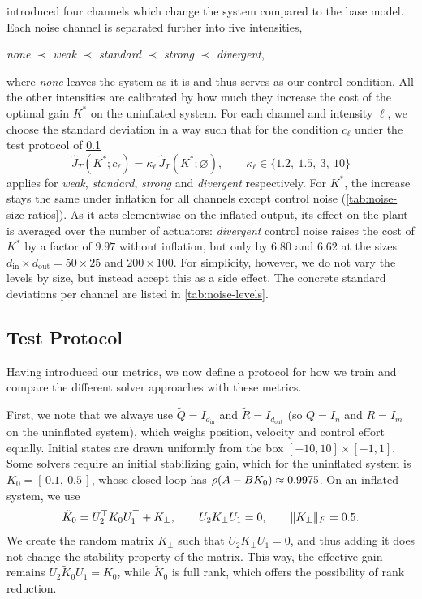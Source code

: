  introduced four channels which change the system
compared to the base model. Each noise channel is separated further
into five intensities,
\begin{center}
    \emph{none} $\prec$ \emph{weak} $\prec$ \emph{standard} $\prec$
    \emph{strong} $\prec$ \emph{divergent},
\end{center}
where \emph{none} leaves the system as it is and thus serves as our
control condition. All the other intensities are calibrated by how much
they increase the cost of the optimal gain $K^{*}$ on the uninflated system.
For each channel and intensity $\ell$, we choose the standard deviation
in a way such that for the condition $c_{\ell}$ under the test protocol of \cref{subsec:protocol}
\begin{equation}
    \label{eq:noise-calibration}
    \hat{J}_T(K^{*}; c_{\ell}) = \kappa_{\ell}\, \hat{J}_T(K^{*}; \varnothing),
    \qquad
    \kappa_{\ell} \in \{1.2,\ 1.5,\ 3,\ 10\}
\end{equation}
applies for \emph{weak}, \emph{standard}, \emph{strong} and \emph{divergent}
respectively.
For $K^{*}$, the increase stays the same under inflation for all channels
except control noise (\cref{tab:noise-size-ratios}). As it acts elementwise on the inflated output, its
effect on the plant is averaged over the number of actuators: \emph{divergent} control noise raises the
cost of $K^{*}$ by a factor of $9.97$ without inflation, but only by $6.80$ and
$6.62$ at the sizes $d_{\mathrm{in}} \times d_{\mathrm{out}} = 50 \times 25$ and $200 \times 100$.
For simplicity, however, we do not vary the levels by size, but instead accept this
as a side effect.
The concrete standard deviations per channel are listed in
\cref{tab:noise-levels}.

\subsection{Test Protocol}
\label{subsec:protocol}

Having introduced our metrics, we now define a protocol for how
we train and compare the different solver approaches with these metrics.

First, we note that we always use $\tilde{Q} = I_{d_{\mathrm{in}}}$ and $\tilde{R} = I_{d_{\mathrm{out}}}$ (so $Q = I_n$ and $R = I_m$ on the uninflated system), which weighs position,
velocity and control effort equally. Initial states are drawn uniformly from the
box $[-10, 10] \times [-1, 1]$. Some solvers require an initial stabilizing gain,
which for the uninflated system is $K_0 = [\,0.1,\ 0.5\,]$, whose closed loop has $\operatorname{\rho}(A - B K_0) \approx 0.9975$.
On an inflated system, we use
\begin{equation}
    \label{eq:initial-gain}
    \tilde{K}_0 = U_2^{\top} K_0 U_1^{\top} + K_{\perp} , \qquad U_2 K_{\perp} U_1 = 0 , \qquad \lVert K_{\perp} \rVert_F = 0.5 .
\end{equation}
We create the random matrix $K_{\perp}$ such that $U_2 K_{\perp} U_1 = 0$, and thus adding it does not change
the stability property of the matrix. This way, the effective gain remains $U_2 \tilde{K}_0 U_1 = K_0$,
while $\tilde{K}_0$ is full rank, which offers the possibility of rank reduction.

